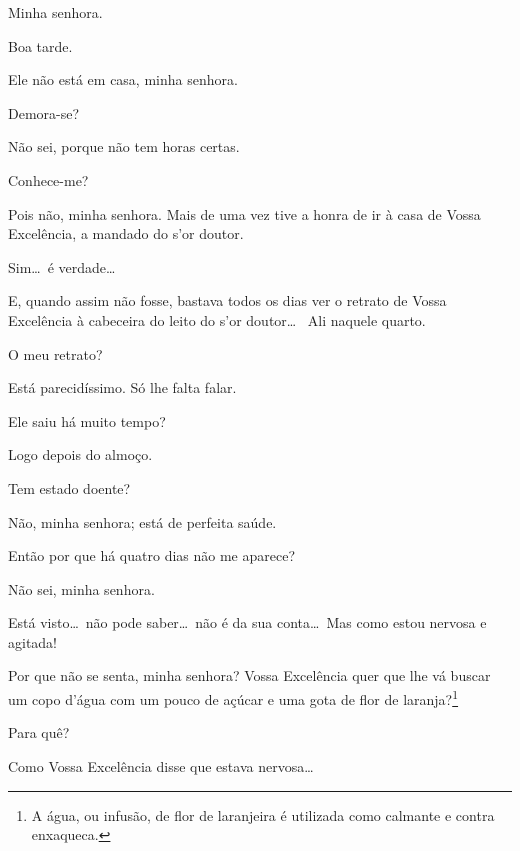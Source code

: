 
  Minha
senhora.

  Boa tarde. 

  Ele não está em casa, minha senhora.

  Demora{}-se?

  Não sei, porque não tem horas certas.

  Conhece{}-me?

  Pois não, minha senhora. Mais de uma vez tive a honra de
ir à casa de Vossa Excelência, a mandado do s'or
doutor.

  Sim\ldots\ é verdade\ldots

  E, quando assim não fosse, bastava todos os dias ver o
retrato de Vossa Excelência à cabeceira do leito do
s'or doutor\ldots\  Ali naquele quarto.

  O meu retrato?

  Está parecidíssimo. Só lhe falta falar.

  Ele saiu há muito tempo?

  Logo depois do almoço.

  Tem estado doente?

  Não, minha senhora; está de perfeita saúde.

   Então por que há quatro
dias não me aparece?

  Não sei, minha senhora.

  Está visto\ldots\ não pode saber\ldots\ não é da sua conta\ldots\ Mas como
estou nervosa e agitada!

  Por que
não se senta, minha senhora?  Vossa
Excelência quer que lhe vá buscar um copo d'água com
um pouco de açúcar e uma gota de flor de laranja?\footnote{
A água, ou infusão, de flor de laranjeira é utilizada como calmante e contra enxaqueca.}

  Para quê?

  Como Vossa Excelência disse que estava nervosa\ldots

